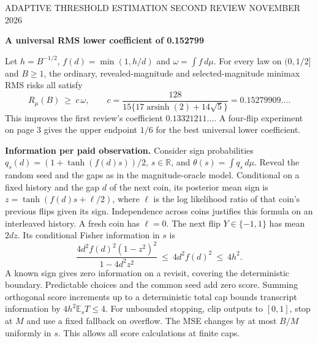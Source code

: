 \documentclass[11pt]{article}
\newcommand{\E}{\mathbb E}
\newcommand{\heading}[1]{{\LARGE\bfseries\color{ink} #1}\par\smallskip}
\begin{document}
{\small\color{ink} ADAPTIVE THRESHOLD ESTIMATION \hfill SECOND REVIEW  NOVEMBER 2026}\par
\heading{A universal RMS lower coefficient of 0.152799}
Let $h=B^{-1/2}$, $f(d)=\min(1,h/d)$ and $\omega=\int f\,d\mu$. For every law on $(0,1/2]$ and $B\ge1$, the ordinary, revealed-magnitude and selected-magnitude minimax RMS risks all satisfy
\[
 R_\mu(B)\ \ge\ c\,\omega,\qquad
 c=\frac{128}{15\{17\operatorname{arsinh}(2)+14\sqrt5\}}
     =0.15279909\ldots .
\]
This improves the first review's coefficient $0.13321211\ldots$. A four-flip experiment on page 3 gives the upper endpoint $1/6$ for the best universal lower coefficient.

\textbf{Information per paid observation.}
Consider sign probabilities $q_s(d)=(1+\tanh(f(d)s))/2$, $s\in\mathbb R$, and $\theta(s)=\int q_s\,d\mu$. Reveal the random seed and the gaps as in the magnitude-oracle model. Conditional on a fixed history and the gap $d$ of the next coin, its posterior mean sign is $z=\tanh(f(d)s+\ell/2)$, where $\ell$ is the log likelihood ratio of that coin's previous flips given its sign. Independence across coins justifies this formula on an interleaved history. A fresh coin has $\ell=0$. The next flip $Y\in\{-1,1\}$ has mean $2dz$. Its conditional Fisher information in $s$ is
\[
 \frac{4d^2 f(d)^2(1-z^2)^2}{1-4d^2z^2}\ \le\ 4d^2 f(d)^2\ \le\ 4h^2 .
\]
A known sign gives zero information on a revisit, covering the deterministic boundary. Predictable choices and the common seed add zero score. Summing orthogonal score increments up to a deterministic total cap bounds transcript information by $4h^2\E_s T\le4$. For unbounded stopping, clip outputs to $[0,1]$, stop at $M$ and use a fixed fallback on overflow. The MSE changes by at most $B/M$ uniformly in $s$. This allows all score calculations at finite caps.
\end{document}
